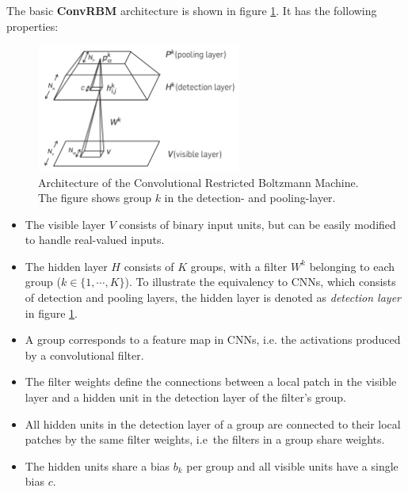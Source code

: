 The basic \textbf{ConvRBM} architecture is shown in figure \ref{fig:convrbm_architecture}.
It has the following properties:\cite{lee_convolutional_2009-1}

\begin{figure}[H]
    \centering
    \includegraphics[width=0.6\textwidth]{img_deep/convrbm_architecture}
    \caption{Architecture of the Convolutional Restricted Boltzmann Machine. The figure shows group $k$ in the detection- and pooling-layer. \cite{lee_convolutional_2009-1}}
    \label{fig:convrbm_architecture}
\end{figure}

\begin{itemize}
    \item The visible layer $V$ consists of binary input units, but can be easily modified to handle real-valued inputs.
    \item The hidden layer $H$ consists of $K$ groups, with a filter $W^k$ belonging to each group ($k \in \{1,\cdots, K\}$).
        To illustrate the equivalency to CNNs, which consists of detection and pooling layers, the hidden layer is denoted as \textit{detection layer} in figure \ref{fig:convrbm_architecture}.
    \item A group corresponds to a feature map in CNNs, i.e. the activations produced by a convolutional filter.
    \item The filter weights define the connections between a local patch in the visible layer and a hidden unit in the detection layer of the filter's group.
    \item All hidden units in the detection layer of a group are connected to their local patches by the same filter weights, i.e\ the filters in a group share weights.
    \item The hidden units share a bias $b_k$ per group and all visible units have a single bias $c$.
\end{itemize}

